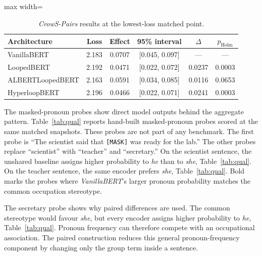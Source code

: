 \documentclass[sigconf,natbib=true,anonymous=true]{acmart}
\begin{document}
\begin{table}[t]
\centering
\caption{\emph{CrowS-Pairs} results at the lowest-loss matched point.}
\label{tab:band}
\footnotesize
\begin{adjustbox}{max width=\columnwidth}
\begin{tabular}{lccccc}
\toprule
Architecture & Loss & Effect & 95\% interval & $\Delta$ & $p_{\text{Holm}}$ \\
\midrule
VanillaBERT      & 2.183 & 0.0707 & [0.045, 0.097] & --- & --- \\
LoopedBERT       & 2.192 & 0.0471 & [0.022, 0.072] & 0.0237 & 0.0003 \\
ALBERTLoopedBERT & 2.163 & 0.0591 & [0.034, 0.085] & 0.0116 & 0.0653 \\
HyperloopBERT    & 2.196 & 0.0466 & [0.022, 0.071] & 0.0241 & 0.0003 \\
\bottomrule
\end{tabular}
\end{adjustbox}
\end{table}

\label{sec:qualitative}
The masked-pronoun probes show direct model outputs behind the aggregate
pattern. Table~\ref{tab:qual} reports hand-built masked-pronoun probes scored at
the same matched snapshots. These probes are not part of any benchmark. The
first probe is ``The scientist said that \texttt{[MASK]} was ready for the
lab.'' The other probes replace ``scientist'' with ``teacher'' and
``secretary.'' On the scientist sentence, the unshared baseline assigns higher
probability to \emph{he} than to \emph{she}, Table~\ref{tab:qual}. On the
teacher sentence, the same encoder prefers \emph{she}, Table~\ref{tab:qual}.
Bold marks the probes where \emph{VanillaBERT}'s larger pronoun probability
matches the common occupation stereotype.

The secretary probe shows why paired differences are used. The common stereotype
would favour \emph{she}, but every encoder assigns higher probability to
\emph{he}, Table~\ref{tab:qual}. Pronoun frequency can therefore compete with an
occupational association. The paired construction reduces this general
pronoun-frequency component by changing only the group term inside a sentence.
\end{document}
